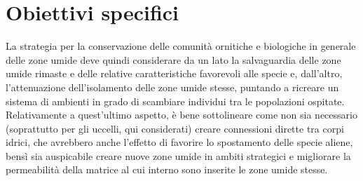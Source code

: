 \documentclass[10pt,twoside,openany,x11names,svgnames,italian,a5paper,dvipsnames,table]{memoir}
\begin{document}
\section{Obiettivi specifici}
La strategia per la conservazione delle comunità ornitiche e biologiche in generale delle zone umide deve quindi considerare da un lato la salvaguardia delle zone umide rimaste e delle relative caratteristiche favorevoli alle specie e, dall'altro, l'attenuazione dell'isolamento delle zone umide stesse, puntando a ricreare un sistema di ambienti in grado di scambiare individui tra le popolazioni ospitate. Relativamente a quest’ultimo aspetto, è bene sottolineare come non sia necessario (soprattutto per gli uccelli, qui considerati) creare connessioni dirette tra corpi idrici, che avrebbero anche l'effetto di favorire lo spostamento delle specie aliene, bensì sia auspicabile creare nuove zone umide in ambiti strategici e migliorare la permeabilità della matrice al cui interno sono inserite  le zone umide stesse.
\end{document}
